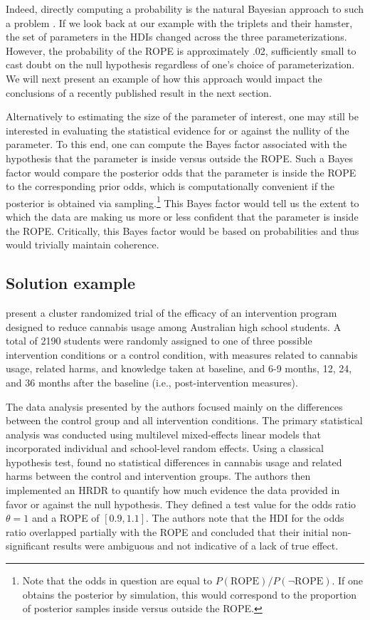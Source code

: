 \documentclass[9pt,twocolumn,twoside]{cidlab-draft}\templatetype{cidlab-invited}
\newcommand{\hdr}{HRDR}
\begin{document}
Indeed, directly computing a probability is the natural Bayesian approach to such a problem \cite{wellek2002testing}. If we look back at our example with the triplets and their hamster, the set of parameters in the HDIs changed across the three parameterizations. However, the probability of the ROPE is approximately .02, sufficiently small to cast doubt on the null hypothesis regardless of one's choice of parameterization.  We will next present an example of how this approach would impact the conclusions of a recently published result in the next section.

Alternatively to estimating the size of the parameter of interest, one may still be interested in evaluating the statistical evidence for or against the nullity of the parameter. To this end, one can compute the Bayes factor associated with the hypothesis that the parameter is inside versus outside the ROPE. Such a Bayes factor would compare the posterior odds that the parameter is inside the ROPE to the corresponding prior odds, which is computationally convenient if the posterior is obtained via sampling.\footnote{Note that the odds in question are equal to $P(\text{ROPE})/P(\lnot \text{ROPE})$. If one obtains the posterior by simulation, this would correspond to the proportion of posterior samples inside versus outside the ROPE.} This Bayes factor would tell us the extent to which the data are making us more or less confident that the parameter is inside the ROPE. Critically, this Bayes factor would be based on probabilities and thus would trivially maintain coherence.

\subsection*{Solution example}

 present a cluster randomized trial of the efficacy of an intervention program designed to reduce cannabis usage among Australian high school students. A total of 2190 students were randomly assigned to one of three possible intervention conditions or a control condition, with measures related to cannabis usage, related harms, and knowledge taken at baseline, and 6-9 months, 12, 24, and 36 months after the baseline (i.e., post-intervention measures).  

The data analysis presented by the authors focused mainly on the differences between the control group and all intervention conditions. The primary statistical analysis was conducted using multilevel mixed-effects linear models that incorporated individual and school-level random effects. 
%
Using a classical hypothesis test, \citeauthor{newton2018} found no statistical differences in cannabis usage and related harms between the control and intervention groups. 
The authors then implemented an \hdr{} to quantify how much evidence the data provided in favor or against the null hypothesis. 
They defined a test value for the odds ratio $\theta=1$ and a ROPE of $[0.9,1.1]$. The authors note that the HDI for the odds ratio overlapped partially with the ROPE and concluded that their initial non-significant results were ambiguous and not indicative of a lack of true effect.
\end{document}
